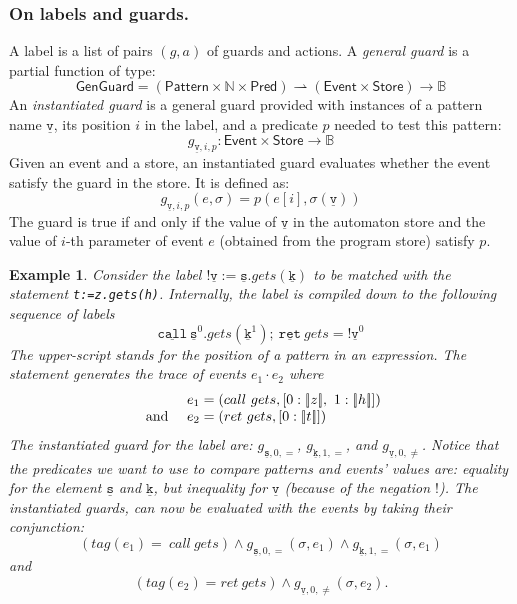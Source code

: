 \documentclass[10pt, preprint]{sigplanconf} %
\newcommand{\noterg}[2]{\textcolor{gray}{[\textcolor{red}{#1}: #2]}}
\newcommand{\rlp}[1]{\noterg{rlp}{#1}}
\newcommand{\B}{\ensuremath{\mathbb{B}}}
\newcommand{\N}{\ensuremath{\mathbb{N}}}
\newcommand{\pattern}[1]{\ensuremath{\mathtt{\underline{#1}}}}
\newcommand{\pmap}{\rightharpoonup}
\newcommand{\set}[1]{\ensuremath{\mathsf{#1}}}
\newtheorem{example}{Example}
\begin{document}
\subsubsection{On labels and guards.} %

A label is a list of pairs $(g,a)$ of guards and actions. A  {\em general guard} is a partial function of type:
\[
\set{GenGuard} = (\set{Pattern} \times \N \times \set{Pred}) \pmap (\set{Event}\times\set{Store}) \to \B
\]
An {\em instantiated guard} is a general guard provided with instances of a pattern  name $\pattern v$,  its position $i$ in the label, and a predicate $p$ needed to test this pattern:
\[
g_{\pattern{v},i,p} : \set{Event}\times\set{Store} \to \B
\]
Given an event and a store, an instantiated guard  evaluates whether the event satisfy the guard in the store. It is defined as:
\newcommand{\sem}[1]{[ \! | #1 | \! ]}
\[
g_{\pattern{v},i,p}(e, \sigma) = p(e[i],\sigma(\pattern v))
\] The guard is true if and only if the value of $\pattern{v}$ in the automaton store
and the value of $i$-th parameter of  event $e$ (obtained from the program store) satisfy $p$.
\begin{example}
Consider the label
 $ !\pattern {v} := \pattern {s}.gets(\pattern {k})$ to be matched with the statement
 {\tt t:=z.gets(h)}. Internally,  the label is compiled down to the
 following sequence of labels
\[
\pattern{call} \  \pattern{s}^0 .gets(\pattern {k}^1);  \ \pattern{ret} \ gets = ! \pattern {v}^0
\] The upper-script stands for the position of a pattern in an expression. The statement generates the trace of events $e_1 \cdot e_2$ where
\[
\begin{array}{l l}
 & e_1=(call \ gets, [0: \sem{z}, \ 1: \sem{h}])  \\
 \mbox{ and }  &  e_2= (ret \ gets, [0: \sem{t}]) 
\end{array}
\]
The instantiated guard for the label are:
 $g_{\pattern{s},0,=}$, $g_{\pattern{k},1,=}$, and  $g_{\pattern{v},0, \neq}$.
Notice that the predicates we want to use to compare patterns and events' values are: equality for the element $\pattern{s}$ and $\pattern{k}$,
but inequality for \pattern{v} (because of the negation $!$).
The instantiated guards, can now be evaluated with the events by taking their conjunction:
\[
 (tag(e_1)= \ call \ gets) \wedge g_{\pattern{s},0,=}(\sigma,e_1) \wedge g_{\pattern{k},1,=}(\sigma, e_1)
\] and
\[
 (tag(e_2)= ret \ gets) \wedge g_{\pattern{v},0,\neq}(\sigma,e_2).
\]
\end{example}
\end{document}
